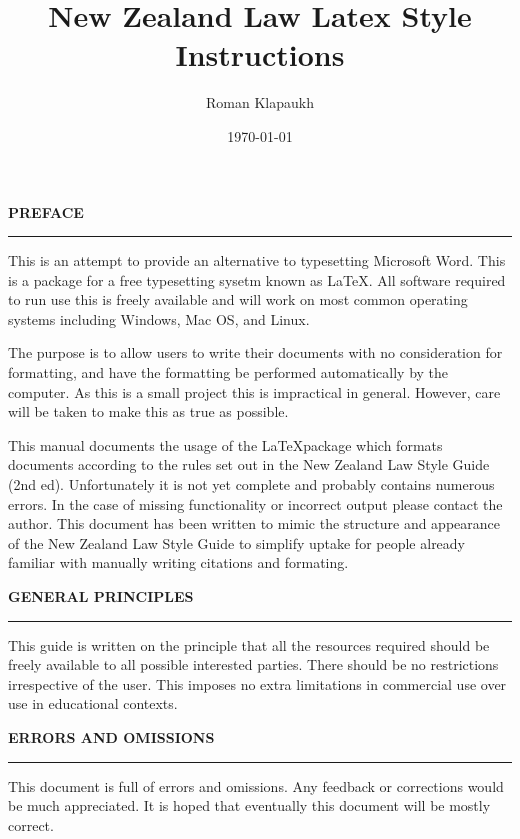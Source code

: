 \documentclass{book}
\begin{document}
\title{New Zealand Law Latex Style Instructions}
\author{Roman Klapaukh}
\date{\today}
\frontmatter
\pagestyle{fancy}

\maketitle


\tableofcontents

\newpage
{}
{\noindent\large\bfseries\MakeUppercase{Preface}\hrule \vspace{2ex}}

This is an attempt to provide an alternative to typesetting Microsoft Word. 
This is a package for a free typesetting sysetm known as \LaTeX. 
All software required to run use this is freely available and will work on 
most common operating systems including Windows, Mac OS, and Linux.

The purpose is to allow users to write their documents with no consideration
for formatting, and have the formatting be performed automatically by the computer.
As this is a small project this is impractical in general. However, care will be taken
to make this as true as possible. 

This manual documents the usage of the \LaTeX package which formats documents
according to the rules set out in the New Zealand Law Style Guide (2nd ed).
Unfortunately it is not yet complete and probably contains numerous errors.
In the case of missing functionality or incorrect output please contact the 
author. This document has been written to mimic the  structure and appearance
of the New Zealand Law Style Guide to simplify uptake for people already 
familiar with manually writing citations and formating.


{\noindent\large\bfseries\MakeUppercase{General Principles} \hrule\vspace{2ex}}
This guide is written on the principle that all the resources required should be freely available to all possible interested parties. 
There should be no restrictions irrespective of the user. 
This imposes no extra limitations in commercial use over use in educational contexts.

{\noindent\large\bfseries\MakeUppercase{Errors and Omissions}\hrule\vspace{2ex}}
This document is full of errors and omissions. 
Any feedback or corrections would be much appreciated. 
It is hoped that eventually this document will be mostly correct.
\end{document}
